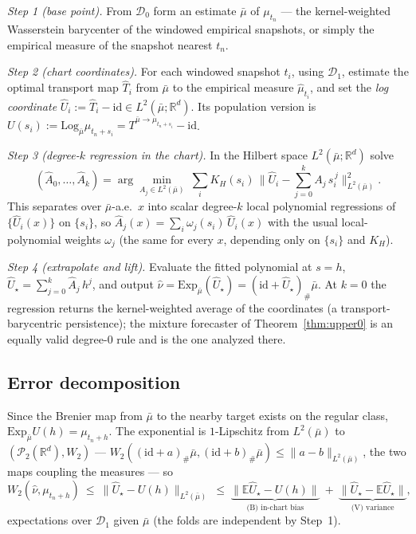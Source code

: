 \documentclass[11pt]{article}
\theoremstyle{definition}
\theoremstyle{remark}
\newcommand{\R}{\mathbb{R}}
\newcommand{\E}{\mathbb{E}}
\newcommand{\PP}{\mathcal{P}_2(\R^d)}
\begin{document}
\emph{Step 1 (base point).} From $\mathcal D_0$ form an estimate $\bar\mu$ of $\mu_{t_n}$ --- the
kernel-weighted Wasserstein barycenter of the windowed empirical snapshots, or simply the
empirical measure of the snapshot nearest $t_n$.

\emph{Step 2 (chart coordinates).} For each windowed snapshot $t_i$, using $\mathcal D_1$,
estimate the optimal transport map $\hat T_i$ from $\bar\mu$ to the empirical measure
$\hat\mu_{t_i}$, and set the \emph{log coordinate} $\hat U_i:=\hat T_i-\mathrm{id}\in
L^2(\bar\mu;\R^d)$. Its population version is $U(s_i):=\mathrm{Log}_{\bar\mu}\mu_{t_n+s_i}
=T^{\bar\mu\to\mu_{t_n+s_i}}-\mathrm{id}$.

\emph{Step 3 (degree-$k$ regression in the chart).} In the Hilbert space $L^2(\bar\mu;\R^d)$ solve
\[
   (\hat A_0,\dots,\hat A_k)=\arg\min_{A_j\in L^2(\bar\mu)}\ \sum_i K_H(s_i)\,
   \Big\|\hat U_i-\textstyle\sum_{j=0}^k A_j\,s_i^{\,j}\Big\|_{L^2(\bar\mu)}^2 .
\]
This separates over $\bar\mu$-a.e.\ $x$ into scalar degree-$k$ local polynomial regressions of
$\{\hat U_i(x)\}$ on $\{s_i\}$, so $\hat A_j(x)=\sum_i \omega_j(s_i)\,\hat U_i(x)$ with the usual
local-polynomial weights $\omega_j$ (the same for every $x$, depending only on $\{s_i\}$ and $K_H$).

\emph{Step 4 (extrapolate and lift).} Evaluate the fitted polynomial at $s=h$,
$\hat U_\star=\sum_{j=0}^k \hat A_j\,h^{j}$, and output
$\hat\nu=\mathrm{Exp}_{\bar\mu}(\hat U_\star)=(\mathrm{id}+\hat U_\star)_\#\bar\mu$.
At $k=0$ the regression returns the kernel-weighted average of the coordinates (a
transport-barycentric persistence); the mixture forecaster of Theorem~\ref{thm:upper0} is an
equally valid degree-$0$ rule and is the one analyzed there.

\subsection{Error decomposition}
Since the Brenier map from $\bar\mu$ to the nearby target exists on the regular class,
$\mathrm{Exp}_{\bar\mu}U(h)=\mu_{t_n+h}$. The exponential is $1$-Lipschitz from $L^2(\bar\mu)$ to
$(\PP,W_2)$ --- $W_2((\mathrm{id}+a)_\#\bar\mu,(\mathrm{id}+b)_\#\bar\mu)\le\|a-b\|_{L^2(\bar\mu)}$,
the two maps coupling the measures --- so
\[
   W_2(\hat\nu,\mu_{t_n+h})\ \le\ \|\hat U_\star-U(h)\|_{L^2(\bar\mu)}
   \ \le\ \underbrace{\big\|\E\hat U_\star-U(h)\big\|}_{\text{(B) in-chart bias}}
   \ +\ \underbrace{\big\|\hat U_\star-\E\hat U_\star\big\|}_{\text{(V) variance}},
\]
expectations over $\mathcal D_1$ given $\bar\mu$ (the folds are independent by Step~1).
\end{document}
